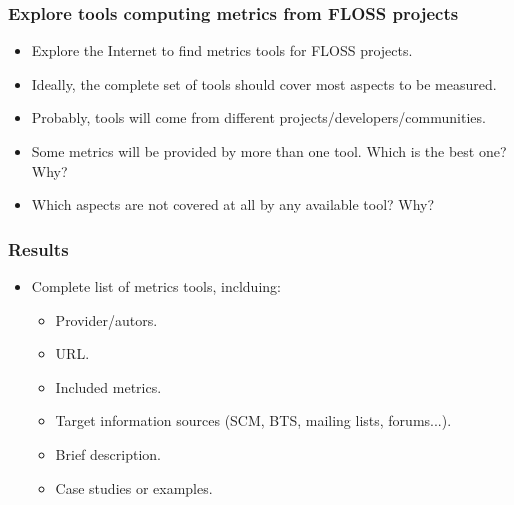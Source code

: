 \documentclass{beamer}
\begin{document}

\begin{frame}
\frametitle{Explore tools computing metrics from FLOSS projects}
\begin{center}
\begin{itemize}
 \item Explore the Internet to find metrics tools for FLOSS projects.
 \item Ideally, the complete set of tools should cover most aspects to be measured.
 \item Probably, tools will come from different projects/developers/communities.
 \item Some metrics will be provided by more than one tool. Which is the best one? Why?
 \item Which aspects are not covered at all by any available tool? Why?
\end{itemize}
\end{center}
\end{frame}


\begin{frame}
\frametitle{Results}
\begin{center}
\begin{itemize}
 \item Complete list of metrics tools, inclduing:
 \begin{itemize}
  \item Provider/autors.
  \item URL.
  \item Included metrics.
  \item Target information sources (SCM, BTS, mailing lists, forums...).
  \item Brief description.
  \item Case studies or examples.
 \end{itemize}

\end{itemize}
\end{center}
\end{frame}
\end{document}
